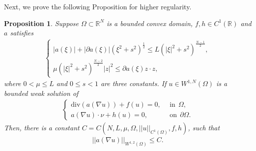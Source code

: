 \documentclass[10pt,a4paper]{amsart}
\numberwithin{equation}{section}
\newtheorem{prop}[thm]{Proposition}
\newcommand{\pa}{\partial}
\newcommand{\R}{\mathbb{R}}
\begin{document}
Next, we prove the  following Proposition for higher regularity. 
\begin{prop}\label{prop2-3}
    Suppose $\Omega \subset \R^N$ is a bounded convex domain, $f , h \in C^1(\R)$%
    and $a$ satisfies
    \begin{align}\label{a-condition}
        \begin{cases}
            |a(\xi)| + |\pa a(\xi)|(\xi^2 + s^2)^{\frac{1}{2}} \leq L(|\xi|^2 + s^2)^{\frac{N-1}{2}}, \\
            \mu (|\xi|^2 + s^2)^{\frac{N-2}{2}} |z|^2 \leq \pa a(\xi)z \cdot z,
        \end{cases}
    \end{align}
    where $0 < \mu \leq L$ and $0 \leq s < 1$ are three constants. If $u \in W^{1,N}(\Omega)$ is a bounded weak solution of
    \begin{align*}
        \begin{cases}
            \text{div} (a(\nabla u )) + f(u) = 0, \ \ & \text{in} \ \ \Omega, \\
            a(\nabla u) \cdot \nu + h(u) = 0, \ \ & \text{on} \ \ \pa \Omega.
        \end{cases}
    \end{align*}
    Then, there is a constant $C = C(N ,L ,\mu, \Omega, ||u||_{C^1(\Omega)}, f, h)$, such that
    \begin{align*}
        ||a(\nabla u)||_{W^{1,2}(\Omega)} \leq C.
    \end{align*}
\end{prop}
\end{document}
